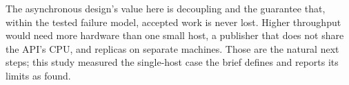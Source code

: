 \documentclass[a4paper]{report}
\begin{document}
The asynchronous design's value here is decoupling and the guarantee that,
within the tested failure model, accepted work is never lost. Higher
throughput would need more hardware than one small host, a publisher that
does not share the API's CPU, and replicas on separate
machines.
Those are the natural next steps; this study measured the single-host case
the brief defines and reports its limits as found.

\renewcommand{\bibname}{References}
\end{document}
